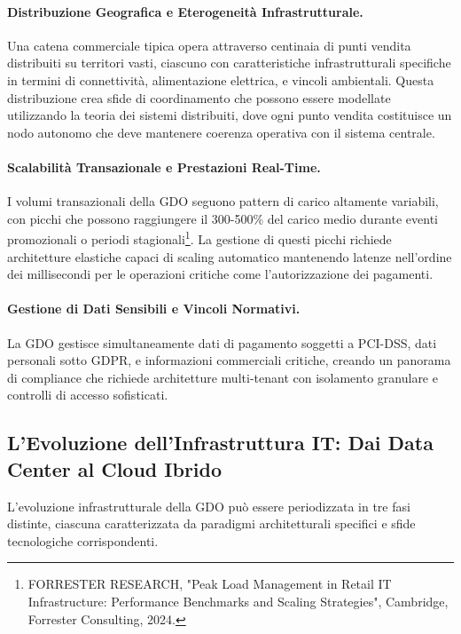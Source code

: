 \documentclass[12pt,a4paper,oneside]{book}
\begin{document}
\paragraph{Distribuzione Geografica e Eterogeneità Infrastrutturale.} Una catena commerciale tipica opera attraverso centinaia di punti vendita distribuiti su territori vasti, ciascuno con caratteristiche infrastrutturali specifiche in termini di connettività, alimentazione elettrica, e vincoli ambientali. Questa distribuzione crea sfide di coordinamento che possono essere modellate utilizzando la teoria dei sistemi distribuiti, dove ogni punto vendita costituisce un nodo autonomo che deve mantenere coerenza operativa con il sistema centrale.

\paragraph{Scalabilità Transazionale e Prestazioni Real-Time.} I volumi transazionali della GDO seguono pattern di carico altamente variabili, con picchi che possono raggiungere il 300-500\% del carico medio durante eventi promozionali o periodi stagionali\footnote{FORRESTER RESEARCH, "Peak Load Management in Retail IT Infrastructure: Performance Benchmarks and Scaling Strategies", Cambridge, Forrester Consulting, 2024.}. La gestione di questi picchi richiede architetture elastiche capaci di scaling automatico mantenendo latenze nell'ordine dei millisecondi per le operazioni critiche come l'autorizzazione dei pagamenti.

\paragraph{Gestione di Dati Sensibili e Vincoli Normativi.} La GDO gestisce simultaneamente dati di pagamento soggetti a PCI-DSS, dati personali sotto GDPR, e informazioni commerciali critiche, creando un panorama di compliance che richiede architetture multi-tenant con isolamento granulare e controlli di accesso sofisticati.

\subsection{L'Evoluzione dell'Infrastruttura IT: Dai Data Center al Cloud Ibrido}
\label{ssec:evoluzione_it}

L'evoluzione infrastrutturale della GDO può essere periodizzata in tre fasi distinte, ciascuna caratterizzata da paradigmi architetturali specifici e sfide tecnologiche corrispondenti.
\end{document}
